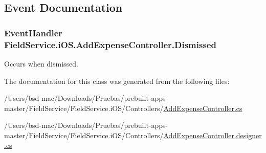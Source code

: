 \subsection{Event Documentation}
\hypertarget{class_field_service_1_1i_o_s_1_1_add_expense_controller_abd627b481111903d98bd58cf9811a4a9}{
\subsubsection[{Dismissed}]{\setlength{\rightskip}{0pt plus 5cm}Event\+Handler Field\+Service.\+i\+O\+S.\+Add\+Expense\+Controller.\+Dismissed}}\label{class_field_service_1_1i_o_s_1_1_add_expense_controller_abd627b481111903d98bd58cf9811a4a9}


Occurs when dismissed. 



The documentation for this class was generated from the following files\+:\begin{DoxyCompactItemize}
\item 
/\+Users/bsd-\/mac/\+Downloads/\+Pruebas/prebuilt-\/apps-\/master/\+Field\+Service/\+Field\+Service.\+i\+O\+S/\+Controllers/\hyperlink{_add_expense_controller_8cs}{Add\+Expense\+Controller.\+cs}\item 
/\+Users/bsd-\/mac/\+Downloads/\+Pruebas/prebuilt-\/apps-\/master/\+Field\+Service/\+Field\+Service.\+i\+O\+S/\+Controllers/\hyperlink{_add_expense_controller_8designer_8cs}{Add\+Expense\+Controller.\+designer.\+cs}\end{DoxyCompactItemize}
